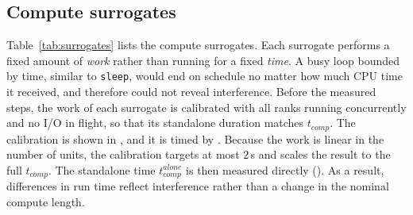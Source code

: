 \subsection{Compute surrogates}
\label{sec:surrogates}
\begin{table}[t]
\centering
\small
\setlength{\tabcolsep}{3pt}
\caption{Compute surrogates used in place of the computation phase. All are
calibrated to the same standalone duration $t_{comp}$. Lines refer to
Listing~\ref{lst:kernels} (CPU) and Listing~\ref{lst:gpu} (GPU).}
\label{tab:surrogates}
\end{table}

Table~\ref{tab:surrogates} lists the compute surrogates. Each surrogate
performs a fixed amount of \emph{work} rather than running for a fixed
\emph{time}. A busy loop bounded by time, similar to \texttt{sleep}, would end
on schedule no matter how much CPU time it received, and therefore could not
reveal interference. Before the measured steps, the work of each surrogate is
calibrated with all ranks running concurrently and no I/O in flight, so that
its standalone duration matches $t_{comp}$. The calibration is shown in
\srcCalibrate, and it is timed by \srcTimedMax. Because the work is linear in
the number of units, the calibration targets at most 2\,s and scales the
result to the full $t_{comp}$. The standalone time $t_{comp}^{alone}$ is then
measured directly (\srcBaseline). As a result, differences in run time
reflect interference rather than a change in the nominal compute length.

